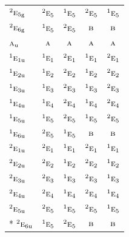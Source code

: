 \documentclass[10pt,a4paper]{article}
\numberwithin{equation}{section}
\newcommand{\irr}[1]{\text{\normalfont\scshape #1}}
\newcommand{\conjpair}[1]{{}^{#1}}
\newcommand{\ptag}[1]{\mathrm{#1}}
\begin{document}
{\begin{longtable}{@{}lcccc@{}}
$\conjpair{2}\irr{e}_{5\ptag{g}}$ & $\conjpair{2}\irr{e}_{5}$ & $\conjpair{1}\irr{e}_{5}$ & $\conjpair{2}\irr{e}_{5}$ & $\conjpair{1}\irr{e}_{5}$\\
$\conjpair{2}\irr{e}_{6\ptag{g}}$ & $\conjpair{1}\irr{e}_{5}$ & $\conjpair{2}\irr{e}_{5}$ & $\irr{b}$ & $\irr{b}$\\
$\irr{a}_{\ptag{u}}$ & $\irr{a}$ & $\irr{a}$ & $\irr{a}$ & $\irr{a}$\\
$\conjpair{1}\irr{e}_{1\ptag{u}}$ & $\conjpair{1}\irr{e}_{1}$ & $\conjpair{2}\irr{e}_{1}$ & $\conjpair{1}\irr{e}_{1}$ & $\conjpair{2}\irr{e}_{1}$\\
$\conjpair{1}\irr{e}_{2\ptag{u}}$ & $\conjpair{1}\irr{e}_{2}$ & $\conjpair{2}\irr{e}_{2}$ & $\conjpair{1}\irr{e}_{2}$ & $\conjpair{2}\irr{e}_{2}$\\
$\conjpair{1}\irr{e}_{3\ptag{u}}$ & $\conjpair{1}\irr{e}_{3}$ & $\conjpair{2}\irr{e}_{3}$ & $\conjpair{1}\irr{e}_{3}$ & $\conjpair{2}\irr{e}_{3}$\\
$\conjpair{1}\irr{e}_{4\ptag{u}}$ & $\conjpair{1}\irr{e}_{4}$ & $\conjpair{2}\irr{e}_{4}$ & $\conjpair{1}\irr{e}_{4}$ & $\conjpair{2}\irr{e}_{4}$\\
$\conjpair{1}\irr{e}_{5\ptag{u}}$ & $\conjpair{1}\irr{e}_{5}$ & $\conjpair{2}\irr{e}_{5}$ & $\conjpair{1}\irr{e}_{5}$ & $\conjpair{2}\irr{e}_{5}$\\
$\conjpair{1}\irr{e}_{6\ptag{u}}$ & $\conjpair{2}\irr{e}_{5}$ & $\conjpair{1}\irr{e}_{5}$ & $\irr{b}$ & $\irr{b}$\\
$\conjpair{2}\irr{e}_{1\ptag{u}}$ & $\conjpair{2}\irr{e}_{1}$ & $\conjpair{1}\irr{e}_{1}$ & $\conjpair{2}\irr{e}_{1}$ & $\conjpair{1}\irr{e}_{1}$\\
$\conjpair{2}\irr{e}_{2\ptag{u}}$ & $\conjpair{2}\irr{e}_{2}$ & $\conjpair{1}\irr{e}_{2}$ & $\conjpair{2}\irr{e}_{2}$ & $\conjpair{1}\irr{e}_{2}$\\
$\conjpair{2}\irr{e}_{3\ptag{u}}$ & $\conjpair{2}\irr{e}_{3}$ & $\conjpair{1}\irr{e}_{3}$ & $\conjpair{2}\irr{e}_{3}$ & $\conjpair{1}\irr{e}_{3}$\\
$\conjpair{2}\irr{e}_{4\ptag{u}}$ & $\conjpair{2}\irr{e}_{4}$ & $\conjpair{1}\irr{e}_{4}$ & $\conjpair{2}\irr{e}_{4}$ & $\conjpair{1}\irr{e}_{4}$\\
$\conjpair{2}\irr{e}_{5\ptag{u}}$ & $\conjpair{2}\irr{e}_{5}$ & $\conjpair{1}\irr{e}_{5}$ & $\conjpair{2}\irr{e}_{5}$ & $\conjpair{1}\irr{e}_{5}$\\*
$\conjpair{2}\irr{e}_{6\ptag{u}}$ & $\conjpair{1}\irr{e}_{5}$ & $\conjpair{2}\irr{e}_{5}$ & $\irr{b}$ & $\irr{b}$\\
\bottomrule\end{longtable}}
\end{document}
